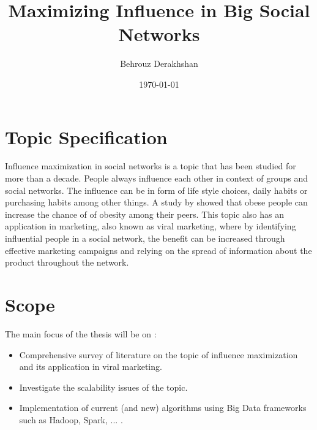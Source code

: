 \documentclass[english]{tktltiki}
\begin{document}
\onehalfspacing

\title{Maximizing Influence in Big Social Networks}
\author{Behrouz Derakhshan}
\date{\today}

\maketitle


\section{Topic Specification}
Influence maximization in social networks is a topic that has been studied for more than a decade. People always influence each other in context of groups and social networks. The influence can be in form of life style choices, daily habits or purchasing habits among other things. A study by \cite{christ07} showed that obese people can increase the chance of of obesity among their peers. This topic also has an application in marketing, also known as viral marketing,  where by identifying influential people in a social network, the benefit can be increased through effective marketing campaigns and relying on the spread of information about the product throughout the network. 
\section{Scope}
The main focus of the thesis will be on :
\begin{itemize}
\item Comprehensive survey of literature on the topic of influence maximization and its application in viral marketing.
\item Investigate the scalability issues of the topic.
\item Implementation of current (and new) algorithms using Big Data frameworks  such as Hadoop, Spark, ... .
\end{itemize}
\end{document}
